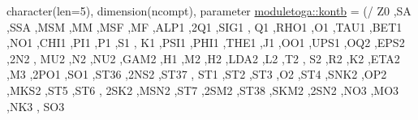 \begin{DoxyCompactItemize}
character(len=5), dimension(ncompt), parameter \mbox{\hyperlink{namespacemoduletoga_a9443f9f365057429abfbafa77dce1caf}{moduletoga\+::kontb}} = (/ \textquotesingle{}Z0 \textquotesingle{},\textquotesingle{}SA \textquotesingle{},\textquotesingle{}S\+SA \textquotesingle{},\textquotesingle{}M\+SM \textquotesingle{},\textquotesingle{}MM \textquotesingle{},\textquotesingle{}M\+SF \textquotesingle{},\textquotesingle{}MF \textquotesingle{},\textquotesingle{}A\+L\+P1 \textquotesingle{},\textquotesingle{}2\+Q1 \textquotesingle{},\textquotesingle{}\+S\+I\+G1 \textquotesingle{}, \textquotesingle{}\+Q1 \textquotesingle{},\textquotesingle{}\+R\+H\+O1 \textquotesingle{},\textquotesingle{}\+O1 \textquotesingle{},\textquotesingle{}\+T\+A\+U1 \textquotesingle{},\textquotesingle{}\+B\+E\+T1 \textquotesingle{},\textquotesingle{}\+N\+O1 \textquotesingle{},\textquotesingle{}\+C\+H\+I1 \textquotesingle{},\textquotesingle{}\+P\+I1 \textquotesingle{},\textquotesingle{}\+P1 \textquotesingle{},\textquotesingle{}\+S1 \textquotesingle{}, \textquotesingle{}\+K1 \textquotesingle{},\textquotesingle{}\+P\+S\+I1 \textquotesingle{},\textquotesingle{}\+P\+H\+I1 \textquotesingle{},\textquotesingle{}\+T\+H\+E1 \textquotesingle{},\textquotesingle{}\+J1 \textquotesingle{},\textquotesingle{}\+O\+O1 \textquotesingle{},\textquotesingle{}\+U\+P\+S1 \textquotesingle{},\textquotesingle{}\+O\+Q2 \textquotesingle{},\textquotesingle{}\+E\+P\+S2 \textquotesingle{},\textquotesingle{}2\+N2 \textquotesingle{}, \textquotesingle{}\+M\+U2 \textquotesingle{},\textquotesingle{}\+N2 \textquotesingle{},\textquotesingle{}\+N\+U2 \textquotesingle{},\textquotesingle{}\+G\+A\+M2 \textquotesingle{},\textquotesingle{}\+H1 \textquotesingle{},\textquotesingle{}\+M2 \textquotesingle{},\textquotesingle{}\+H2 \textquotesingle{},\textquotesingle{}\+L\+D\+A2 \textquotesingle{},\textquotesingle{}\+L2 \textquotesingle{},\textquotesingle{}\+T2 \textquotesingle{}, \textquotesingle{}\+S2 \textquotesingle{},\textquotesingle{}\+R2 \textquotesingle{},\textquotesingle{}\+K2 \textquotesingle{},\textquotesingle{}\+E\+T\+A2 \textquotesingle{},\textquotesingle{}\+M3 \textquotesingle{},\textquotesingle{}2\+P\+O1 \textquotesingle{},\textquotesingle{}\+S\+O1 \textquotesingle{},\textquotesingle{}\+S\+T36 \textquotesingle{},\textquotesingle{}2\+N\+S2 \textquotesingle{},\textquotesingle{}\+S\+T37 \textquotesingle{}, \textquotesingle{}\+S\+T1 \textquotesingle{},\textquotesingle{}\+S\+T2 \textquotesingle{},\textquotesingle{}\+S\+T3 \textquotesingle{},\textquotesingle{}\+O2 \textquotesingle{},\textquotesingle{}\+S\+T4 \textquotesingle{},\textquotesingle{}\+S\+N\+K2 \textquotesingle{},\textquotesingle{}\+O\+P2 \textquotesingle{},\textquotesingle{}\+M\+K\+S2 \textquotesingle{},\textquotesingle{}\+S\+T5 \textquotesingle{},\textquotesingle{}\+S\+T6 \textquotesingle{}, \textquotesingle{}2\+S\+K2 \textquotesingle{},\textquotesingle{}\+M\+S\+N2 \textquotesingle{},\textquotesingle{}\+S\+T7 \textquotesingle{},\textquotesingle{}2\+S\+M2 \textquotesingle{},\textquotesingle{}\+S\+T38 \textquotesingle{},\textquotesingle{}\+S\+K\+M2 \textquotesingle{},\textquotesingle{}2\+S\+N2 \textquotesingle{},\textquotesingle{}\+N\+O3 \textquotesingle{},\textquotesingle{}\+M\+O3 \textquotesingle{},\textquotesingle{}\+N\+K3 \textquotesingle{}, \textquotesingle{}\+S\+O3 
\end{DoxyCompactItemize}
